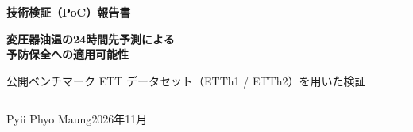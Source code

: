 \documentclass[aspectratio=169,10pt]{beamer}
\begin{document}
{
\begin{frame}[plain]
  \vspace{1.2cm}
  {\color{accent}\small\bfseries 技術検証（PoC）報告書}\par\vspace{0.3cm}
  {\color{ink}\LARGE\bfseries 変圧器油温の24時間先予測による\\[0.15cm]予防保全への適用可能性}\par\vspace{0.4cm}
  {\color{muted}\normalsize 公開ベンチマーク ETT データセット（ETTh1 / ETTh2）を用いた検証}\par
  \vfill
  {\color{rule}\rule{\textwidth}{0.8pt}}\par\vspace{0.15cm}
  {\small Pyii Phyo Maung}\hfill{\small\color{muted}2026年11月}
  \vspace{0.6cm}
\end{frame}}
\end{document}
